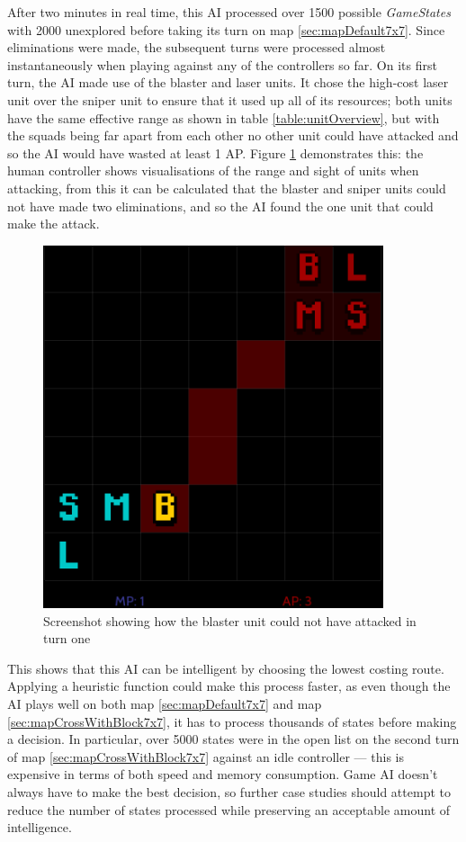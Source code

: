 \documentclass[11pt, a4paper]{report}
\begin{document}
After two minutes in real time, this AI processed over 1500 possible \emph{GameStates} with 2000 unexplored before taking its turn on map \ref{sec:mapDefault7x7}. Since eliminations were made, the subsequent turns were processed almost instantaneously when playing against any of the controllers so far. On its first turn, the AI made use of the blaster and laser units. It chose the high-cost laser unit over the sniper unit to ensure that it used up all of its resources; both units have the same effective range as shown in table \ref{table:unitOverview}, but with the squads being far apart from each other no other unit could have attacked and so the AI would have wasted at least 1 AP. Figure \ref{fig:caseStudyThree7x7Game} demonstrates this: the human controller shows visualisations of the range and sight of units when attacking, from this it can be calculated that the blaster and sniper units could not have made two eliminations, and so the AI found the one unit that could make the attack.

\begin{figure}[!h]
  \centering
  \includegraphics[width=10cm]{img/case_three_7x7_game.png}
  \caption{Screenshot showing how the blaster unit could not have attacked in turn one}
  \label{fig:caseStudyThree7x7Game}
\end{figure}

This shows that this AI can be intelligent by choosing the lowest costing route. Applying a heuristic function could make this process faster, as even though the AI plays well on both map \ref{sec:mapDefault7x7} and map \ref{sec:mapCrossWithBlock7x7}, it has to process thousands of states before making a decision. In particular, over 5000 states were in the open list on the second turn of map \ref{sec:mapCrossWithBlock7x7} against an idle controller --- this is expensive in terms of both speed and memory consumption. Game AI doesn't always have to make the best decision, so further case studies should attempt to reduce the number of states processed while preserving an acceptable amount of intelligence.
\end{document}

